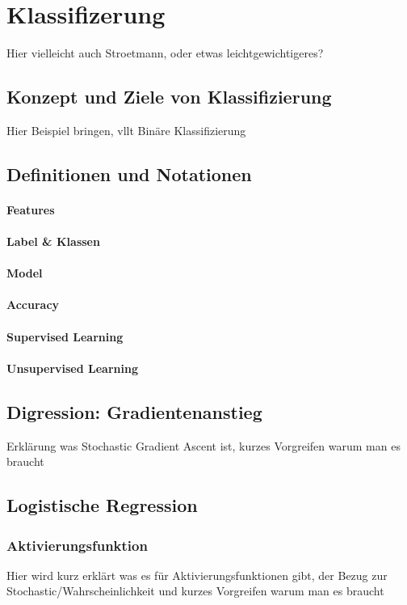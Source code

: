 \section{Klassifizerung}
\label{sec:Klassifizierung}
Hier vielleicht auch Stroetmann, oder etwas leichtgewichtigeres?
\subsection{Konzept und Ziele von Klassifizierung}
Hier Beispiel bringen, vllt Binäre Klassifizierung

\subsection{Definitionen und Notationen}
\paragraph{Features}
\paragraph{Label \& Klassen}
\paragraph{Model}
\paragraph{Accuracy}

\paragraph{Supervised Learning}
\paragraph{Unsupervised Learning}

\subsection{Digression: Gradientenanstieg}
Erklärung was Stochastic Gradient Ascent ist, kurzes Vorgreifen warum man es braucht
\subsection{Logistische Regression}

\subsubsection{Aktivierungsfunktion}
Hier wird kurz erklärt was es für Aktivierungsfunktionen gibt, der Bezug zur Stochastic/Wahrscheinlichkeit und kurzes Vorgreifen warum man es braucht
